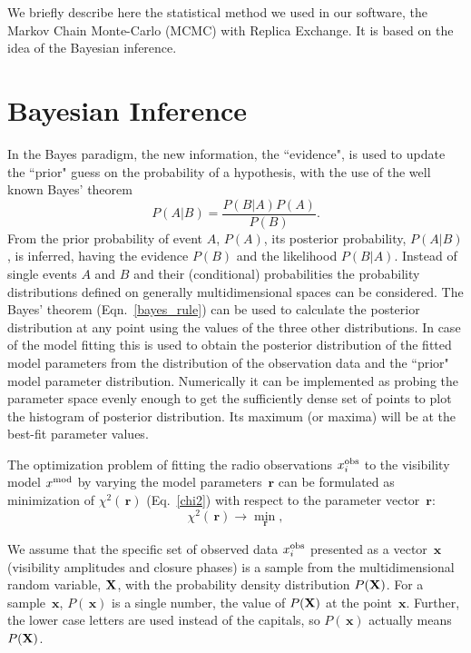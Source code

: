 \documentclass[preprint2]{aastex}
\newcommand{\bfr}{\,\mathbf{r}}
\newcommand{\bfx}{\,\mathbf{x}}
\begin{document}
We briefly describe here the statistical method we used in our software, the Markov Chain Monte-Carlo (MCMC) with Replica Exchange. It is based on the idea of the Bayesian inference. 



\section{Bayesian Inference}\label{bayesian}

In the Bayes paradigm, the new information, the ``evidence", is used to update the ``prior" guess on the probability of a hypothesis, with the use of the well known Bayes' theorem
\begin{equation}
  \label{bayes_rule}
  P(A|B) =  \frac{P(B|A)P(A)}{P(B)}.
\end{equation}
From the prior probability of event $A$, $P(A)$, its posterior probability, $P(A|B)$, is inferred, having the evidence $P(B)$ and the likelihood $P(B|A)$. Instead of single events $A$ and $B$ and their (conditional) probabilities the probability distributions defined on generally multidimensional spaces can be considered. The Bayes' theorem (Eqn.~\eqref{bayes_rule}) can be used to calculate the posterior distribution at any point using the values of the three other distributions. In case of the model fitting this is used to obtain the posterior distribution of the fitted model parameters from the distribution of the observation data and the ``prior" model parameter distribution. Numerically it can be implemented as  probing the parameter space evenly enough to get the sufficiently dense set of points to plot the histogram of posterior distribution. Its maximum (or maxima) will be at the best-fit parameter values.

The optimization problem of fitting the radio observations $x_i^{\rm obs}$ to the visibility model $x^{\rm mod}$ by varying the model parameters $\bfr$ can be formulated as minimization of $\chi^2(\bfr)$ (Eq.~\eqref{chi2}) with respect to the parameter vector $\bfr$:
\begin{equation*}
  \label{chi2_nonumber}
  \chi^2(\bfr) \rightarrow {\min\limits_{\bfr}},
\end{equation*}

We assume that the specific set of observed data $x_i^{\rm obs}$ presented as a vector $\bfx$ (visibility amplitudes and closure phases) is a sample from the multidimensional random variable, ${\bf X}$, with the probability density distribution $P({\bf X})$. For a sample $\bfx$, $P(\bfx)$ is a single number, the value of $P({\bf X})$ at the point $\bfx$. Further, the lower case letters are used instead of the capitals, so $P(\bfx)$ actually means $P({\bf X})$.
\end{document}
